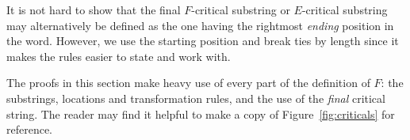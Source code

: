 \documentclass[ALCO,ThmDefs,Unicode,epreuves]{cedram}
\begin{document}
\begin{rema}
It is not hard to show that the final $F$-critical substring or $E$-critical substring may alternatively be defined as the one having the rightmost \emph{ending} position in the word. However, we use the starting position and break ties by length since it makes the rules easier to state and work with.
\end{rema}

\begin{rema}
The proofs in this section make heavy use of every part of the definition of $F$: the substrings, locations and transformation rules, and the use of the \emph{final} critical string. The reader may find it helpful to make a copy of Figure~\ref{fig:criticals} for reference.
\end{rema}
\end{document}
